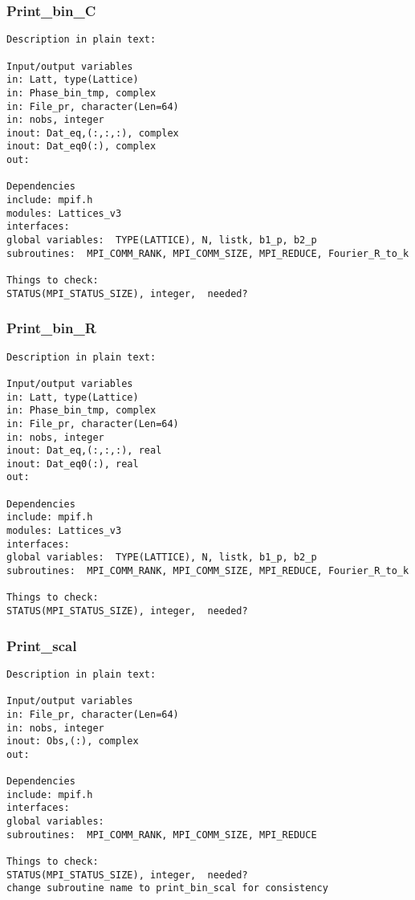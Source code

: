 \subsubsection{Print\_bin\_C}
\begin{verbatim}
Description in plain text:

Input/output variables
in: Latt, type(Lattice)
in: Phase_bin_tmp, complex
in: File_pr, character(Len=64)
in: nobs, integer
inout: Dat_eq,(:,:,:), complex
inout: Dat_eq0(:), complex
out:

Dependencies
include: mpif.h
modules: Lattices_v3
interfaces: 
global variables:  TYPE(LATTICE), N, listk, b1_p, b2_p
subroutines:  MPI_COMM_RANK, MPI_COMM_SIZE, MPI_REDUCE, Fourier_R_to_k

Things to check:
STATUS(MPI_STATUS_SIZE), integer,  needed?
\end{verbatim}

\subsubsection{Print\_bin\_R}
\begin{verbatim}
Description in plain text:

Input/output variables
in: Latt, type(Lattice)
in: Phase_bin_tmp, complex
in: File_pr, character(Len=64)
in: nobs, integer
inout: Dat_eq,(:,:,:), real
inout: Dat_eq0(:), real
out:

Dependencies
include: mpif.h
modules: Lattices_v3
interfaces: 
global variables:  TYPE(LATTICE), N, listk, b1_p, b2_p
subroutines:  MPI_COMM_RANK, MPI_COMM_SIZE, MPI_REDUCE, Fourier_R_to_k

Things to check:
STATUS(MPI_STATUS_SIZE), integer,  needed?
\end{verbatim}

\subsubsection{Print\_scal}
\begin{verbatim}
Description in plain text:

Input/output variables
in: File_pr, character(Len=64)
in: nobs, integer
inout: Obs,(:), complex
out:

Dependencies
include: mpif.h
interfaces: 
global variables:
subroutines:  MPI_COMM_RANK, MPI_COMM_SIZE, MPI_REDUCE

Things to check:
STATUS(MPI_STATUS_SIZE), integer,  needed?
change subroutine name to print_bin_scal for consistency
\end{verbatim}

